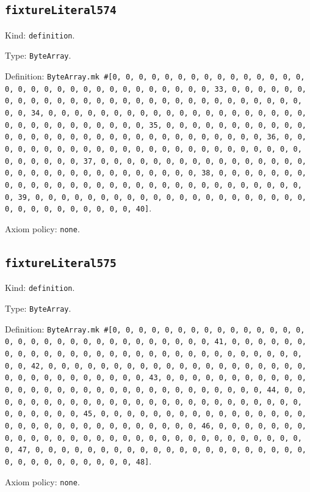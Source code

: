 \documentclass[11pt]{article}
\begin{document}
\subsection*{\texttt{fixtureLiteral574}}
\noindent Kind: \texttt{definition}.\par
\noindent Type: \texttt{ByteArray}.\par
\noindent Definition: \texttt{ByteArray.mk \#[0, 0, 0, 0, 0, 0, 0, 0, 0, 0, 0, 0, 0, 0, 0, 0, 0, 0, 0, 0, 0, 0, 0, 0, 0, 0, 0, 0, 0, 0, 0, 33, 0, 0, 0, 0, 0, 0, 0, 0, 0, 0, 0, 0, 0, 0, 0, 0, 0, 0, 0, 0, 0, 0, 0, 0, 0, 0, 0, 0, 0, 0, 0, 34, 0, 0, 0, 0, 0, 0, 0, 0, 0, 0, 0, 0, 0, 0, 0, 0, 0, 0, 0, 0, 0, 0, 0, 0, 0, 0, 0, 0, 0, 0, 0, 35, 0, 0, 0, 0, 0, 0, 0, 0, 0, 0, 0, 0, 0, 0, 0, 0, 0, 0, 0, 0, 0, 0, 0, 0, 0, 0, 0, 0, 0, 0, 0, 36, 0, 0, 0, 0, 0, 0, 0, 0, 0, 0, 0, 0, 0, 0, 0, 0, 0, 0, 0, 0, 0, 0, 0, 0, 0, 0, 0, 0, 0, 0, 0, 37, 0, 0, 0, 0, 0, 0, 0, 0, 0, 0, 0, 0, 0, 0, 0, 0, 0, 0, 0, 0, 0, 0, 0, 0, 0, 0, 0, 0, 0, 0, 0, 38, 0, 0, 0, 0, 0, 0, 0, 0, 0, 0, 0, 0, 0, 0, 0, 0, 0, 0, 0, 0, 0, 0, 0, 0, 0, 0, 0, 0, 0, 0, 0, 39, 0, 0, 0, 0, 0, 0, 0, 0, 0, 0, 0, 0, 0, 0, 0, 0, 0, 0, 0, 0, 0, 0, 0, 0, 0, 0, 0, 0, 0, 0, 0, 40]}.\par
\noindent Axiom policy: \texttt{none}.\par
\subsection*{\texttt{fixtureLiteral575}}
\noindent Kind: \texttt{definition}.\par
\noindent Type: \texttt{ByteArray}.\par
\noindent Definition: \texttt{ByteArray.mk \#[0, 0, 0, 0, 0, 0, 0, 0, 0, 0, 0, 0, 0, 0, 0, 0, 0, 0, 0, 0, 0, 0, 0, 0, 0, 0, 0, 0, 0, 0, 0, 41, 0, 0, 0, 0, 0, 0, 0, 0, 0, 0, 0, 0, 0, 0, 0, 0, 0, 0, 0, 0, 0, 0, 0, 0, 0, 0, 0, 0, 0, 0, 0, 42, 0, 0, 0, 0, 0, 0, 0, 0, 0, 0, 0, 0, 0, 0, 0, 0, 0, 0, 0, 0, 0, 0, 0, 0, 0, 0, 0, 0, 0, 0, 0, 43, 0, 0, 0, 0, 0, 0, 0, 0, 0, 0, 0, 0, 0, 0, 0, 0, 0, 0, 0, 0, 0, 0, 0, 0, 0, 0, 0, 0, 0, 0, 0, 44, 0, 0, 0, 0, 0, 0, 0, 0, 0, 0, 0, 0, 0, 0, 0, 0, 0, 0, 0, 0, 0, 0, 0, 0, 0, 0, 0, 0, 0, 0, 0, 45, 0, 0, 0, 0, 0, 0, 0, 0, 0, 0, 0, 0, 0, 0, 0, 0, 0, 0, 0, 0, 0, 0, 0, 0, 0, 0, 0, 0, 0, 0, 0, 46, 0, 0, 0, 0, 0, 0, 0, 0, 0, 0, 0, 0, 0, 0, 0, 0, 0, 0, 0, 0, 0, 0, 0, 0, 0, 0, 0, 0, 0, 0, 0, 47, 0, 0, 0, 0, 0, 0, 0, 0, 0, 0, 0, 0, 0, 0, 0, 0, 0, 0, 0, 0, 0, 0, 0, 0, 0, 0, 0, 0, 0, 0, 0, 48]}.\par
\noindent Axiom policy: \texttt{none}.\par
\end{document}
